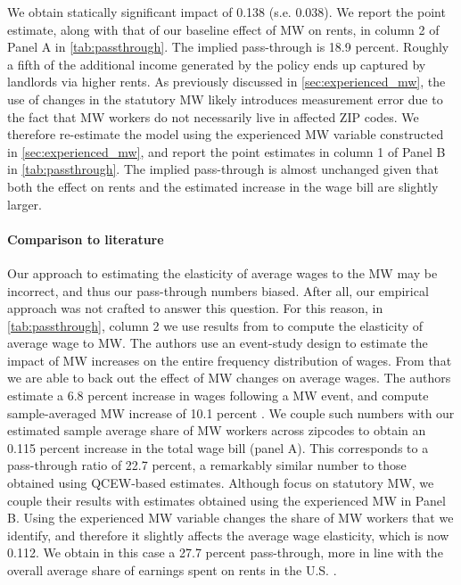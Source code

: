 We obtain statically significant impact of 0.138 (s.e. 0.038). We report the point estimate, 
along with that of our baseline effect of MW on rents, in column 2 of Panel A in 
\autoref{tab:passthrough}. The implied pass-through is 18.9 percent. Roughly a fifth of the 
additional income generated by the policy ends up captured by landlords via higher rents. As 
previously discussed in \autoref{sec:experienced_mw}, the use of changes in the statutory 
MW likely introduces measurement error due to the fact that MW workers do not necessarily 
live in affected ZIP codes. We therefore re-estimate the model using the experienced MW 
variable constructed in \autoref{sec:experienced_mw}, and report the point estimates in column 
1 of Panel B in \autoref{tab:passthrough}. The implied pass-through is almost unchanged given 
that both the effect on rents and the estimated increase in the wage bill are slightly larger.

\paragraph{Comparison to literature} Our approach to estimating the elasticity of average wages
to the MW may be incorrect, and thus our pass-through numbers biased. After all, our empirical
approach was not crafted to answer this question. For this reason, in \autoref{tab:passthrough}, 
column 2 we use results from \textcite{CegnizEtAl2019} to compute the elasticity of average wage 
to MW. The authors use an event-study design to estimate the impact of MW increases on the 
entire frequency distribution of wages. From that we are able to back out the effect of MW 
changes on average wages. The authors estimate a 6.8 percent increase in wages following a MW
event, and compute sample-averaged MW increase of 10.1 percent \parencite[][Table I]
{CegnizEtAl2019}. We couple such numbers with our estimated sample average share of MW workers 
across zipcodes to obtain an 0.115 percent increase in the total wage bill (panel A). This 
corresponds to a pass-through ratio of 22.7 percent, a remarkably similar number to those 
obtained using QCEW-based estimates. Although \textcite{CegnizEtAl2019} focus on statutory MW, 
we couple their results with estimates obtained using the experienced MW in Panel B. Using the 
experienced MW variable changes the share of MW workers that we identify, and therefore it 
slightly affects the average wage elasticity, which is now 0.112. We obtain in this case a 
27.7 percent pass-through, more in line with the overall average share of earnings spent on 
rents in the U.S. \parencite{fernald2020americas}.   

